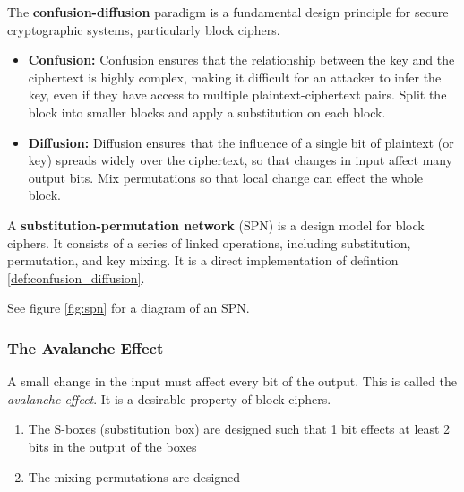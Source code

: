 \begin{defn}
    The \textbf{confusion-diffusion} paradigm is a fundamental design principle for secure cryptographic systems, particularly block ciphers.
    \begin{itemize}
        \item \textbf{Confusion:} Confusion ensures that the relationship between the key and the ciphertext is highly complex, making it difficult for an attacker to infer the key, even if they have access to multiple plaintext-ciphertext pairs. Split the block into smaller blocks and apply a
        substitution on each block.
        \item \textbf{Diffusion:} Diffusion ensures that the influence of a single bit of plaintext (or key) spreads widely over the ciphertext, so that changes in input affect many output bits.  Mix permutations so that local change can effect the
        whole block.
    \end{itemize}
\end{defn} \label{def:confusion_diffusion}

\begin{defn}
    A \textbf{substitution-permutation network} (SPN) is a design model for block ciphers. It consists of a series of linked operations, including substitution, permutation, and key mixing. It is a direct implementation of defintion \ref{def:confusion_diffusion}. 
\end{defn}
See figure \ref{fig:spn} for a diagram of an SPN.


\subsubsection{The Avalanche Effect}
A small change in the input must affect every bit of the output. This is called the \emph{avalanche effect}. It is a desirable property of block ciphers.
\begin{enumerate}
    \item The S-boxes (substitution box) are designed such that 1 bit effects at least 2 bits in the output of the boxes
    \item The mixing permutations are designed
\end{enumerate}

